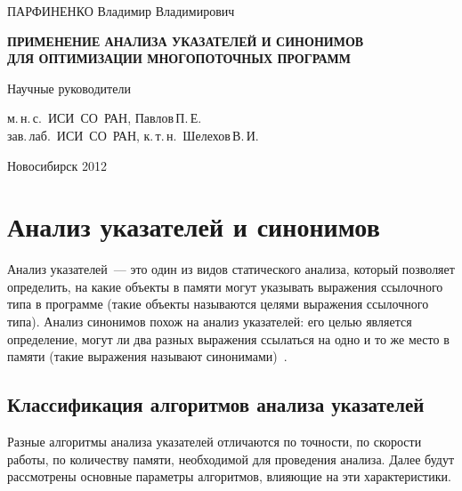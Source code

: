 \documentclass[14pt,titlepage,draft]{extarticle}
\begin{document}
\begin{center}
{      \vspace{0.2cm}

      ПАРФИНЕНКО Владимир Владимирович

      \vspace{1.5cm}

      \textbf{
        ПРИМЕНЕНИЕ АНАЛИЗА УКАЗАТЕЛЕЙ И СИНОНИМОВ\\
        ДЛЯ ОПТИМИЗАЦИИ МНОГОПОТОЧНЫХ ПРОГРАММ
      }

      \vspace{2.5cm}

      \begin{flushright}

        Научные руководители

        м.\,н.\,с.~ИСИ~СО~РАН, Павлов\,П.\,Е.\\
        зав.\,лаб.~ИСИ~СО~РАН, к.\,т.\,н.~Шелехов\,В.\,И.

      \end{flushright}

      \vspace {4cm}

      Новосибирск 2012
    }
  \end{center}

  \listoftodos

  \tableofcontents

  \section{Анализ указателей и синонимов}

    Анализ указателей~--- это один из видов статического анализа, который
    позволяет определить, на какие объекты в памяти могут указывать выражения
    ссылочного типа в программе (такие объекты называются целями выражения
    ссылочного типа). Анализ синонимов похож на анализ указателей: его целью
    является определение, могут ли два разных выражения ссылаться на одно и
    то же место в памяти (такие выражения называют синонимами)~\cite{andersen}.

    \subsection{Классификация алгоритмов анализа указателей}
    \label{section:analysis_classification}

      Разные алгоритмы анализа указателей отличаются по точности, по скорости
      работы, по количеству памяти, необходимой для проведения анализа.
      Далее будут рассмотрены основные параметры алгоритмов, влияющие на эти
      характеристики.
\end{document}
